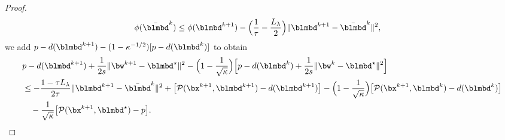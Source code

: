 \begin{proof}
\[\begin{aligned}
    \phi(\bar{\blmbd}^k)
    &\le\phi(\blmbd^{k+1})
    -\Bigl(\frac{1}{\tau}-\frac{L_\lambda}{2}\Bigr)
    \|\blmbd^{k+1}-\bar{\blmbd}^k\|^2,
\end{aligned}
\]
we add \(p-d(\blmbd^{k+1})-(1-\kappa^{-1/2})[p-d(\blmbd^k)]\) to obtain
\begin{equation}
\label{eq:b2-prime-dual-nesterov}
\begin{aligned}
    &p-d(\blmbd^{k+1})+\frac{1}{2s}\|\bw^{k+1}-\blmbd^\star\|^2
    -\Bigl(1-\frac{1}{\sqrt{\kappa}}\Bigr)\Bigl[p-d(\blmbd^k)
    +\frac{1}{2s}\|\bw^k-\blmbd^\star\|^2\Bigr]\\
    &\le-\frac{1-\tau L_\lambda}{2\tau}\|\blmbd^{k+1}-\bar{\blmbd}^k\|^2
    +\bigl[\mathcal P(\bx^{k+1},\blmbd^{k+1})-d(\blmbd^{k+1})\bigr]
    -\Bigl(1-\frac{1}{\sqrt{\kappa}}\Bigr)
    \bigl[\mathcal P(\bx^{k+1},\blmbd^k)-d(\blmbd^k)\bigr]\\
    &\quad-\frac{1}{\sqrt{\kappa}}\bigl[\mathcal P(\bx^{k+1},\blmbd^\star)-p\bigr].
\end{aligned}
\end{equation}


\end{proof}
